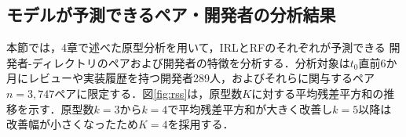 \documentclass[submit,noauthor,ses,dvipdfmx]{ipsj}
\newcommand{\todo}[1]{\colorbox{yellow}{{\bf TODO}:}{\color{red} {\textbf{[#1]}}}}
\begin{document}







\vspace{-2mm}
\subsection{モデルが予測できるペア・開発者の分析結果}
本節では，4章で述べた原型分析を用いて，IRLとRFのそれぞれが予測できる
開発者-ディレクトリのペアおよび開発者の特徴を分析する．分析対象は$t_0$直前6か月にレビューや実装履歴を持つ開発者289人，およびそれらに関与するペア$n = 3,747$ペアに限定する．図\ref{fig:rss}は，原型数$K$に対する平均残差平方和の推移を示す．原型数$k=3$から$k=4$で平均残差平方和が大きく改善し$k=5$以降は改善幅が小さくなったため$K=4$を採用する．
\end{document}
